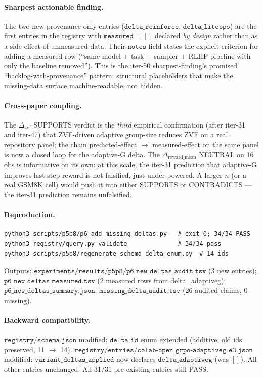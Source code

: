 \documentclass{article}
\begin{document}
\paragraph{Sharpest actionable finding.}
The two new provenance-only entries ($\texttt{delta\_reinforce}$,
$\texttt{delta\_liteppo}$) are the first entries in the registry with
$\texttt{measured}=[]$ declared \emph{by design} rather than as a
side-effect of unmeasured data. Their $\texttt{notes}$ field states
the explicit criterion for adding a measured row
(``same model + task + sampler + RLHF pipeline with only the baseline
removed''). This is the iter-50 sharpest-finding's promised
``backlog-with-provenance'' pattern: structural placeholders that
make the missing-data surface machine-readable, not hidden.

\paragraph{Cross-paper coupling.}
The $\Delta_{\text{zvf}}$ SUPPORTS verdict is the \emph{third}
empirical confirmation (after iter-31 and iter-47) that
ZVF-driven adaptive group-size reduces ZVF on a real repository panel;
the chain predicted-effect $\to$ measured-effect on the same panel
is now a closed loop for the adaptive-G delta. The
$\Delta_{\text{reward\_mean}}$ NEUTRAL on 16 obs is informative on
its own: at this scale, the iter-31 prediction that adaptive-G
improves last-step reward is not falsified, just under-powered. A
larger $n$ (or a real GSM8K cell) would push it into either
SUPPORTS or CONTRADICTS --- the iter-31 prediction remains
unfalsified.

\paragraph{Reproduction.}
\begin{verbatim}
python3 scripts/p5p8/p6_add_missing_deltas.py   # exit 0; 34/34 PASS
python3 registry/query.py validate              # 34/34 pass
python3 scripts/p5p8/regenerate_schema_delta_enum.py  # 14 ids
\end{verbatim}
Outputs: $\texttt{experiments/results/p5p8/p6\_new\_deltas\_audit.tsv}$
(3 new entries); $\texttt{p6\_new\_deltas\_measured.tsv}$ (2 measured
rows from delta\_adaptiveg); $\texttt{p6\_new\_deltas\_summary.json}$;
$\texttt{missing\_delta\_audit.tsv}$ (26 audited claims, 0 missing).

\paragraph{Backward compatibility.}
$\texttt{registry/schema.json}$ modified: $\texttt{delta\_id}$ enum
extended (additive; old ids preserved, 11 $\to$ 14).
$\texttt{registry/entries/colab-open\_grpo-adaptiveg\_e3.json}$
modified: $\texttt{variant\_deltas\_applied}$ now declares
$\texttt{delta\_adaptiveg}$ (was $[]$). All other entries unchanged.
All 31/31 pre-existing entries still PASS.
\end{document}
